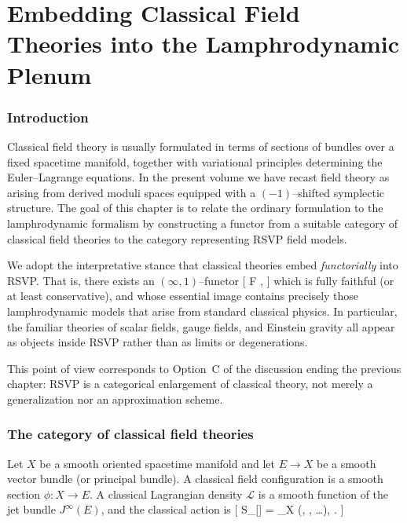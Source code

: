 
\chapter{Embedding Classical Field Theories into the Lamphrodynamic Plenum}
\label{ch:embedding}

\subsection{Introduction}

Classical field theory is usually formulated in terms of sections of bundles over a fixed spacetime manifold, together with variational principles determining the Euler--Lagrange equations. In the present volume we have recast field theory as arising from derived moduli spaces equipped with a $(-1)$--shifted symplectic structure. The goal of this chapter is to relate the ordinary formulation to the lamphrodynamic formalism by constructing a functor from a suitable category of classical field theories to the category representing RSVP field models.

We adopt the interpretative stance that classical theories embed \emph{functorially} into RSVP. That is, there exists an $(\infty,1)$--functor
[
F \colon \CFTh \longrightarrow \RSVP,
]
which is fully faithful (or at least conservative), and whose essential image contains precisely those lamphrodynamic models that arise from standard classical physics. In particular, the familiar theories of scalar fields, gauge fields, and Einstein gravity all appear as objects inside RSVP rather than as limits or degenerations.

\begin{remark}
This point of view corresponds to Option~C of the discussion ending the previous chapter: RSVP is a categorical enlargement of classical theory, not merely a generalization nor an approximation scheme.
\end{remark}

\subsection{The category of classical field theories}

Let $X$ be a smooth oriented spacetime manifold and let $E \to X$ be a smooth vector bundle (or principal bundle). A classical field configuration is a smooth section $\phi \colon X \to E$. A classical Lagrangian density $\mathcal{L}$ is a smooth function of the jet bundle $J^\infty(E)$, and the classical action is
[
S_{}[\phi] = \int_X (\phi, \nabla\phi, \ldots ), .
]

